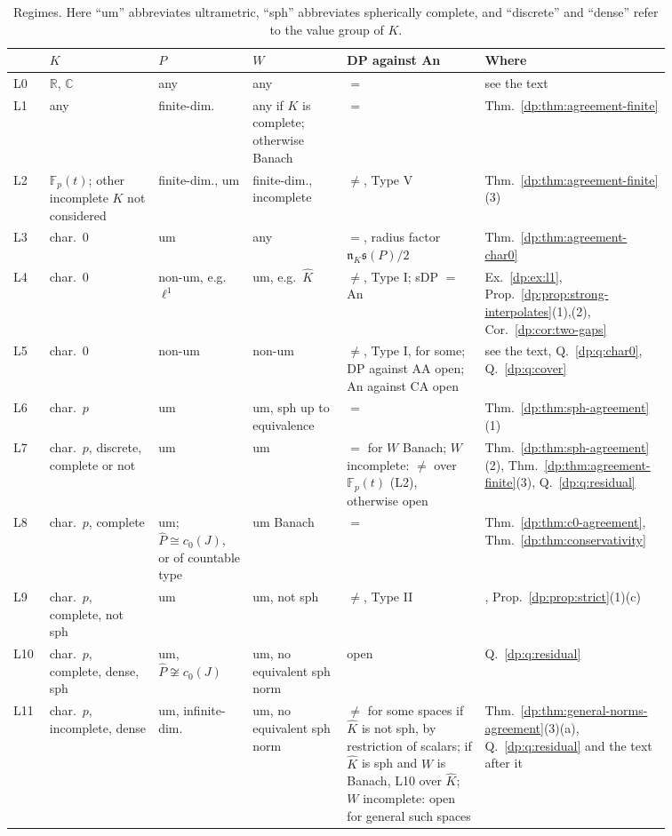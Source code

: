 \documentclass[11pt]{amsart}
\theoremstyle{definition}
\theoremstyle{remark}
\numberwithin{equation}{section}
\newcommand{\F}{\mathbb F}
\newcommand{\Kh}{\widehat K}
\theoremstyle{plain}
\theoremstyle{definition}
\theoremstyle{plain}
\begin{document}
\begin{table}[htbp]
\footnotesize
\caption{Regimes. Here ``um'' abbreviates ultrametric, ``sph'' abbreviates spherically complete, and ``discrete'' and ``dense'' refer to the value group of $K$.}\label{dp:tab:ledger}
\begin{tabular}{@{}p{0.05\linewidth}p{0.155\linewidth}p{0.135\linewidth}p{0.135\linewidth}p{0.195\linewidth}p{0.185\linewidth}@{}}
 & $K$ & $P$ & $W$ & DP against An & Where\\
\hline
L0 & $\mathbb R$, $\mathbb C$ & any & any & $=$ & see the text\\
L1 & any & finite-dim. & any if $K$ is complete; otherwise Banach & $=$ & Thm.~\ref{dp:thm:agreement-finite}\\
L2 & $\F_p(t)$; other incomplete $K$ not considered & finite-dim., um & finite-dim., incomplete & $\ne$, Type V & Thm.~\ref{dp:thm:agreement-finite}(3)\\
L3 & char.\ $0$ & um & any & $=$, radius factor $\mathfrak n_K\mathfrak s(P)/2$ & Thm.~\ref{dp:thm:agreement-char0}\\
L4 & char.\ $0$ & non-um, e.g.\ $\ell^1$ & um, e.g.\ $\Kh$ & $\ne$, Type I; sDP $=$ An & Ex.~\ref{dp:ex:l1}, Prop.~\ref{dp:prop:strong-interpolates}(1),(2), Cor.~\ref{dp:cor:two-gaps}\\
L5 & char.\ $0$ & non-um & non-um & $\ne$, Type I, for some; DP against AA open; An against CA open & see the text, Q.~\ref{dp:q:char0}, Q.~\ref{dp:q:cover}\\
\hline
L6 & char.\ $p$ & um & um, sph up to equivalence & $=$ & Thm.~\ref{dp:thm:sph-agreement}(1)\\
L7 & char.\ $p$, discrete, complete or not & um & um & $=$ for $W$ Banach; $W$ incomplete: $\ne$ over $\F_p(t)$ (L2), otherwise open & Thm.~\ref{dp:thm:sph-agreement}(2), Thm.~\ref{dp:thm:agreement-finite}(3), Q.~\ref{dp:q:residual}\\
L8 & char.\ $p$, complete & um; $\widehat P\cong c_0(J)$, or of countable type & um Banach & $=$ & Thm.~\ref{dp:thm:c0-agreement}, Thm.~\ref{dp:thm:conservativity}\\
L9 & char.\ $p$, complete, not sph & um & um, not sph & $\ne$, Type II & \cite[Theorem~7.2(2)]{I}, Prop.~\ref{dp:prop:strict}(1)(c)\\
L10 & char.\ $p$, complete, dense, sph & um, $\widehat P\not\cong c_0(J)$ & um, no equivalent sph norm & open & Q.~\ref{dp:q:residual}\\
L11 & char.\ $p$, incomplete, dense & um, infinite-dim. & um, no equivalent sph norm & $\ne$ for some spaces if $\Kh$ is not sph, by restriction of scalars; if $\Kh$ is sph and $W$ is Banach, L10 over $\Kh$; $W$ incomplete: open for general such spaces & Thm.~\ref{dp:thm:general-norms-agreement}(3)(a), Q.~\ref{dp:q:residual} and the text after it\\

\end{tabular}
\end{table}
\end{document}

